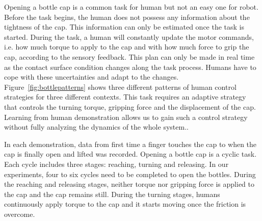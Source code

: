 
Opening a bottle cap is a common task for human but not an easy one
for robot. Before the task begins, the human does not possess any
information about the tightness of the cap. This information can only
be estimated once the task is started. During the task, a human will
constantly update the motor commands, i.e. how much torque to apply to
the cap and with how much force to grip the cap, according to the
sensory feedback. This plan can only be made in real time as the
contact surface condition changes along the task process. Humans have
to cope with these uncertainties and adapt to the
changes. Figure~\ref{fig:bottlepatterns} shows three different
patterns of human control strategies for three different
contexts. This task requires an adaptive strategy that controls the
turning torque, gripping force and the displacement of the
cap. Learning from human demonstration allows us to gain such a
control strategy without fully analyzing the dynamics of the whole
system..

In each demonstration, data from first time a finger touches the cap
to when the cap is finally open and lifted was recorded. Opening a
bottle cap is a cyclic task. Each cycle includes three stages:
reaching, turning and releasing. In our experiments, four to six
cycles need to be completed to open the bottles. During the reaching
and releasing stages, neither torque nor gripping force is applied to the
cap and the cap remains still. During the turning stages, humans
continuously apply torque to the cap and it starts moving once the
friction is overcome.

